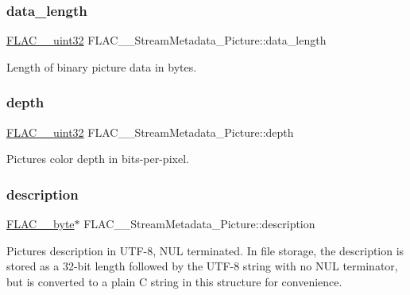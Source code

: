 \subsubsection{\texorpdfstring{data\+\_\+length}{data\_length}}
{\footnotesize\ttfamily \hyperlink{ordinals_8h_a9c4005ea7ef8d564b0cc993cdd0e4e5e}{F\+L\+A\+C\+\_\+\+\_\+uint32} F\+L\+A\+C\+\_\+\+\_\+\+Stream\+Metadata\+\_\+\+Picture\+::data\+\_\+length}

Length of binary picture data in bytes. \mbox{\label{struct_f_l_a_c_____stream_metadata___picture_a0f2092ddf28a6803e9c8adb7328c1967}} 
\subsubsection{\texorpdfstring{depth}{depth}}
{\footnotesize\ttfamily \hyperlink{ordinals_8h_a9c4005ea7ef8d564b0cc993cdd0e4e5e}{F\+L\+A\+C\+\_\+\+\_\+uint32} F\+L\+A\+C\+\_\+\+\_\+\+Stream\+Metadata\+\_\+\+Picture\+::depth}

Picture\textquotesingle{}s color depth in bits-\/per-\/pixel. \mbox{\label{struct_f_l_a_c_____stream_metadata___picture_a5bbfb168b265edfb0b29cfdb71fb413c}} 
\subsubsection{\texorpdfstring{description}{description}}
{\footnotesize\ttfamily \hyperlink{ordinals_8h_a5eb569b12d5b047cdacada4d57924ee3}{F\+L\+A\+C\+\_\+\+\_\+byte}$\ast$ F\+L\+A\+C\+\_\+\+\_\+\+Stream\+Metadata\+\_\+\+Picture\+::description}

Picture\textquotesingle{}s description in U\+T\+F-\/8, N\+UL terminated. In file storage, the description is stored as a 32-\/bit length followed by the U\+T\+F-\/8 string with no N\+UL terminator, but is converted to a plain C string in this structure for convenience. \mbox{\label{struct_f_l_a_c_____stream_metadata___picture_a76dbd1212d330807cda289660f5ee754}} 
